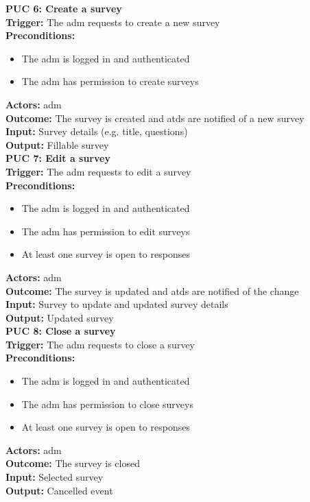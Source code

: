 \documentclass[12pt]{article}
\begin{document}
{\textbf{PUC 6: Create a survey} \\
\textbf{Trigger:} The \gls{adm} requests to create a new survey \\
\textbf{Preconditions:}
\begin{itemize}
  \item The \gls{adm} is logged in and authenticated
  \item The \gls{adm} has permission to create surveys
\end{itemize}
\textbf{Actors:} \Gls{adm} \\
\textbf{Outcome:} The survey is created and \glspl{atd} are notified of a new survey \\
\textbf{Input:} Survey details (e.g. title, questions) \\
\textbf{Output:} Fillable survey \\[1em]

\textbf{PUC 7: Edit a survey} \\
\textbf{Trigger:} The \gls{adm} requests to edit a survey \\
\textbf{Preconditions:}
\begin{itemize}
  \item The \gls{adm} is logged in and authenticated
  \item The \gls{adm} has permission to edit surveys
  \item At least one survey is open to responses
\end{itemize}
\textbf{Actors:} \Gls{adm} \\
\textbf{Outcome:} The survey is updated and \glspl{atd} are notified of the change \\
\textbf{Input:} Survey to update and              updated survey details \\
\textbf{Output:} Updated survey \\[1em]

\textbf{PUC 8: Close a survey} \\
\textbf{Trigger:} The \gls{adm} requests to close a survey \\
\textbf{Preconditions:}
\begin{itemize}
  \item The \gls{adm} is logged in and authenticated
  \item The \gls{adm} has permission to close surveys
  \item At least one survey is open to responses
\end{itemize}
\textbf{Actors:} \Gls{adm} \\
\textbf{Outcome:} The survey is closed \\
\textbf{Input:} Selected survey \\
\textbf{Output:} Cancelled event \\[1em]

}
\end{document}
